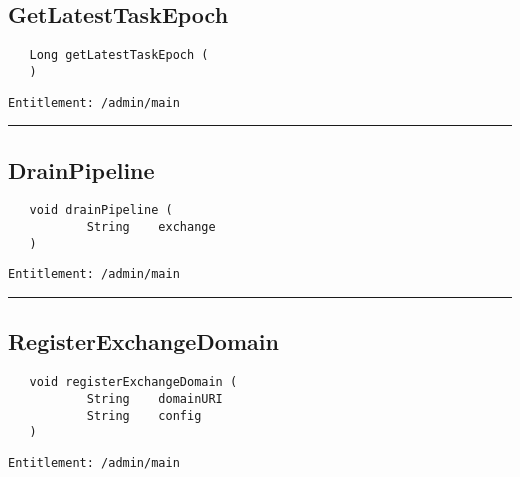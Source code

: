 \subsection{GetLatestTaskEpoch}
\label{Api:GetLatestTaskEpoch}
\begin{verbatim}
   Long getLatestTaskEpoch (
   )
\end{verbatim}
\begin{Verbatim}[fontsize=\small, formatcom=\color{Maroon}]
  Entitlement: /admin/main
\end{Verbatim}



\rule{12cm}{2pt}
\subsection{DrainPipeline}
\label{Api:DrainPipeline}
\begin{verbatim}
   void drainPipeline (
           String    exchange
   )
\end{verbatim}
\begin{Verbatim}[fontsize=\small, formatcom=\color{Maroon}]
  Entitlement: /admin/main
\end{Verbatim}



\rule{12cm}{2pt}
\subsection{RegisterExchangeDomain}
\label{Api:RegisterExchangeDomain}
\begin{verbatim}
   void registerExchangeDomain (
           String    domainURI
           String    config
   )
\end{verbatim}
\begin{Verbatim}[fontsize=\small, formatcom=\color{Maroon}]
  Entitlement: /admin/main
\end{Verbatim}



